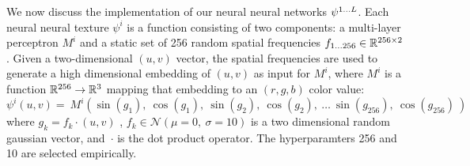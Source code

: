 \documentclass{article}
\begin{document}
		
		We now discuss the implementation of our neural neural networks $\psi^{1\dots L}$.
		Each neural neural texture $\psi^i$ is a function consisting of two components: a multi-layer perceptron $M^i$ and a static set of 256 random spatial frequencies $f_{1...256} \in \mathbb{R} ^ {256 \times 2}$. 
		Given a two-dimensional $(u,v)$ vector, the spatial frequencies are used to generate a high dimensional embedding of $(u,v)$ as input for $M^i$, where $M^i$ is a function $\mathbb{R}^{256} \to \mathbb{R}^{3}$ mapping that embedding to an $(r,g,b)$ color value:
		\begin{equation}
				\psi^i(u,v) = 
				\
				M^i(
					\sin( g_1      ) , \ 
					\cos( g_1      ) , \ 
					\sin( g_2      ) , \ 
					\cos( g_2      ) , \ 
					\dots \ 
					\sin( g_{256}  ) , \ 
					\cos( g_{256}  )  \ 
				)
		\end{equation}
		where $g_k=f_k\cdot(u,v)$
		, $f_k \in \mathcal{N}(\mu=0,\ \sigma=10)$ is a two dimensional random gaussian vector,
		\mbox{and $\cdot$} is the dot product operator.
		The hyperparamters 256 and 10 are selected empirically.
		
\end{document}
